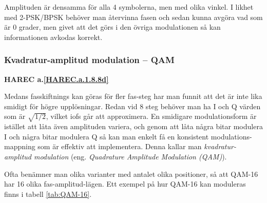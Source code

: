 Amplituden är densamma för alla 4 symbolerna, men med olika vinkel.
I likhet med 2-PSK/BPSK behöver man återvinna fasen och sedan kunna avgöra
vad som är 0 grader, men givet att det görs i den övriga modulationen så
kan informationen avkodas korrekt.

\subsubsection{Kvadratur-amplitud modulation -- QAM}
\textbf{HAREC a.\ref{HAREC.a.1.8.8d}\label{myHAREC.a.1.8.8d}}
\label{QAM}

Medans fasskiftnings kan göras för fler fas-steg har man funnit att det är
inte lika smidigt för högre upplösningar. Redan vid 8 steg behöver man ha
I och Q värden som är \(\sqrt{1/2}\), vilket iofs går att approximera.
En smidigare modulationsform är istället att låta även amplituden variera,
och genom att låta några bitar modulera I och några bitar modulera Q så kan
man enkelt få en konsistent modulations-mappning som är effektiv att
implementera. Denna kallar man \emph{kvadratur-amplitud modulation} (eng.
\emph{Quadrature Amplitude Modulation (QAM)}).

Ofta benämner man olika varianter med antalet olika positioner, så att QAM-16
har 16 olika fas-amplitud-lägen. Ett exempel på hur QAM-16 kan moduleras finns
i tabell \ref{tab:QAM-16}.

